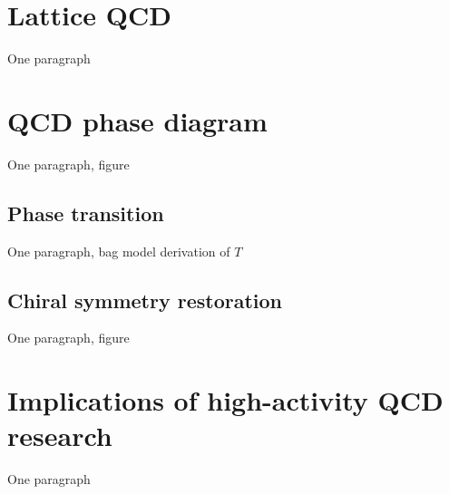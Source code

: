 \section{Lattice QCD}

One paragraph

\section{QCD phase diagram}

One paragraph, figure

\subsection{Phase transition}

One paragraph, bag model derivation of $T$

\subsection{Chiral symmetry restoration}

One paragraph, figure

\section{Implications of high-activity QCD research}

One paragraph